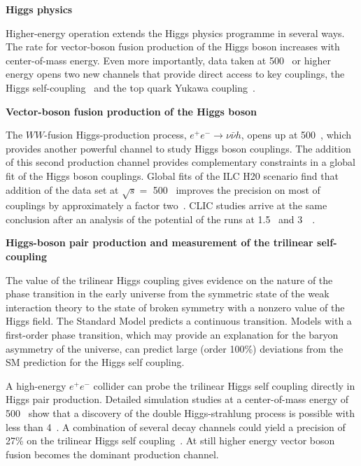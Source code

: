 


{\bf Higgs physics}

Higher-energy operation extends the Higgs physics programme in several ways.
The rate for vector-boson fusion production of the Higgs boson increases with
center-of-mass energy. Even more importantly, data taken
at 500~\GeV{} or higher energy opens two new channels that provide direct
access to key couplings, the Higgs self-coupling~\cite{Barklow:2017awn}
and the top quark Yukawa coupling~\cite{Yonamine:2011jg}.

{\bf Vector-boson fusion production of the Higgs boson}

The $WW$-fusion Higgs-production process,
$e^+e^- \rightarrow \nu \bar{\nu} h$, opens up at 500~\GeV, which
provides another powerful channel to study Higgs boson couplings. The
addition of this second production channel provides complementary
constraints in a global fit of the Higgs boson couplings.
Global fits of the ILC H20 scenario find that addition of the data
set at $\sqrt{s}=$ 500~\GeV{} improves the precision on most of
couplings by approximately a factor two~\cite{Barklow:2017suo}.
CLIC studies arrive at the same conclusion after an analysis of
the potential of the runs at 1.5~\TeV{} and
3~\tev~\cite{Abramowicz:2016zbo}.

{\bf Higgs-boson pair production and measurement of the trilinear self-coupling}

The value of the trilinear Higgs coupling gives evidence on the nature of the phase
transition  in  the  early  universe  from  the  symmetric  state  of  the  weak  interaction
theory to the state of broken symmetry with a nonzero value of the Higgs field. The
Standard Model predicts a continuous transition. Models with a first-order phase transition,
which may provide an explanation for the baryon asymmetry of the universe,
can predict large (order 100\%) deviations from the SM prediction for the Higgs self coupling.

A high-energy $e^+e^-$ collider can probe the trilinear Higgs self coupling directly in Higgs pair production.
Detailed simulation studies at a center-of-mass energy of 500~\GeV{} show that a discovery of the
double Higgs-strahlung process is possible with less than 4~\iab. A combination of several decay channels
could yield a precision of 27\% on the trilinear Higgs self coupling~\cite{Duerig:2016dvi}.
At still higher energy vector boson fusion becomes the dominant production channel.

